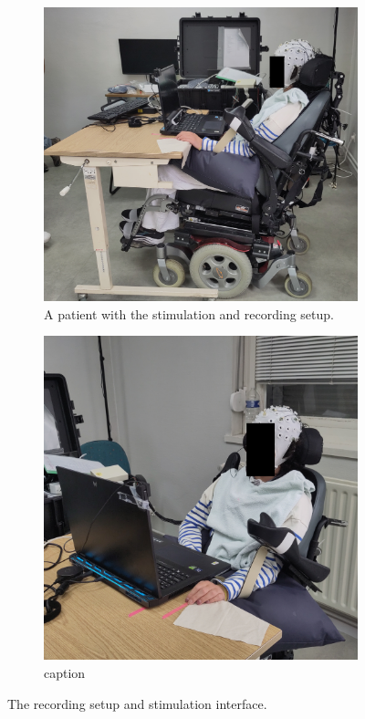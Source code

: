 \begin{figure}
  \begin{subfigure}{.45\textwidth}
    \includegraphics[width=\textwidth]{figures/patients/PD01a-obfuscated.jpg}
    \caption{A patient with the stimulation and recording setup.}
    \label{fig:patients/photos/side}
  \end{subfigure}\hfill%
  \begin{subfigure}{.45\textwidth}
    \includegraphics[width=\textwidth]{figures/patients/PD01b-obfuscated.jpg}
    \caption{caption}
    \label{fig:patients/photos/front}
  \end{subfigure}
  \caption{The recording setup and stimulation interface.}
  \label{fig:patients/photos}
\end{figure}


